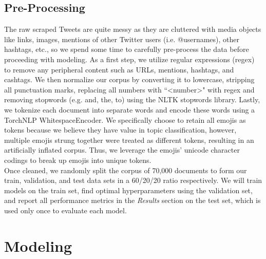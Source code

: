 \documentclass[11pt]{article}
\begin{document}
\subsection{Pre-Processing}

The raw scraped Tweets are quite messy as they are cluttered with media objects like links, images, mentions of other Twitter users (i.e. @usernames), other hashtags, etc., so we spend some time to carefully pre-process the data before proceeding with modeling. As a first step, we utilize regular expressions (regex) to remove any peripheral content such as URLs, mentions, hashtags, and cashtags. We then normalize our corpus by converting it to lowercase, stripping all punctuation marks, replacing all numbers with ``\textless number\textgreater" with regex and removing stopwords (e.g. and, the, to) using the NLTK stopwords library. Lastly, we tokenize each document into separate words and encode these words using a TorchNLP WhitespaceEncoder. We specifically choose to retain all emojis as tokens because we believe they have value in topic classification, however, multiple emojis strung together were treated as different tokens, resulting in an artificially inflated corpus. Thus, we leverage the emojis' unicode character codings to break up emojis into unique tokens.
\\[5pt]
\noindent Once cleaned, we randomly split the corpus of 70,000 documents to form our train, validation, and test data sets in a 60/20/20 ratio respectively. We will train models on the train set, find optimal hyperparameters using the validation set, and report all performance metrics in the \emph{Results} section on the test set, which is used only once to evaluate each model.


\section{Modeling}
\end{document}
